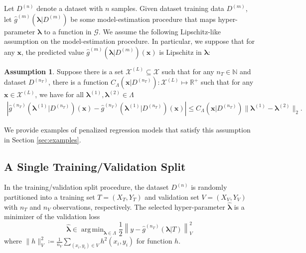 \documentclass[12pt]{article} %
\theoremstyle{definition}
\newtheorem{assump}{Assumption}
\DeclareMathOperator*{\argmin}{arg\,min}
\begin{document}
Let $D^{(n)}$ denote a dataset with $n$ samples.
Given dataset training data $D^{(m)}$, let $\hat{g}^{(m)}(\boldsymbol{\lambda} | D^{(m)})$ be some model-estimation procedure that maps hyper-parameter $\boldsymbol{\lambda}$ to a function in $\mathcal{G}$.
We assume the following Lipschitz-like assumption on the model-estimation procedure.
In particular, we suppose that for any $\boldsymbol{x}$, the predicted value $\hat{g}^{(m)}(\boldsymbol{\lambda} | D^{(m)})(\boldsymbol{x})$ is Lipschitz in $\boldsymbol{\lambda}$:
\begin{assump}
	\label{assump:lipschitz}
	Suppose there is a set $\mathcal{X}^{(L)} \subseteq \mathcal{X}$ such that for any $n_T \in \mathbb{N}$ and dataset $D^{(n_T)}$, there is a function $C_\Lambda(\boldsymbol{x} | D^{(n_T)}) : \mathcal{X}^{(L)} \mapsto \mathbb{R}^+$ such that for any $\boldsymbol{x} \in \mathcal{X}^{(L)}$, we have for all $\boldsymbol{\lambda}^{(1)}, \boldsymbol{\lambda}^{(2)} \in \Lambda$
	\begin{align}
	\left |
	\hat{g}^{(n_T)}(\boldsymbol{\lambda}^{(1)}|D^{(n_T)})(\boldsymbol{x}) - \hat{g}^{(n_T)}(\boldsymbol{\lambda}^{(1)}|D^{(n_T)})(\boldsymbol{x}) \right |
	\le C_\Lambda(\boldsymbol{x}|D^{(n_T)}) \|\boldsymbol{\lambda}^{(1)} - \boldsymbol{\lambda}^{(2)}\|_2.
	\end{align}
\end{assump}
\noindent We provide examples of penalized regression models that satisfy this assumption in Section \ref{sec:examples}.

\subsection{A Single Training/Validation Split}\label{sec:single}

In the training/validation split procedure, the dataset $D^{(n)}$ is randomly partitioned into a training set $T = (X_T, Y_T)$ and validation set $V = (X_V, Y_V)$ with $n_T$ and $n_V$ observations, respectively.
The selected hyper-parameter $\hat{\boldsymbol{\lambda}}$ is a minimizer of the validation loss
\begin{equation}
\label{eq:train_val_lambda}
\hat{\boldsymbol \lambda} \in \argmin_{\boldsymbol{\lambda} \in\Lambda} \frac{1}{2} \left \| y-\hat{g}^{(n_T)}( \boldsymbol \lambda | T) \right \|_{V}^{2}
\end{equation}
where $\| h \|^2_{V} \coloneqq \frac{1}{n_V}\sum_{(x_i, y_i)\in V} h^2(x_i, y_i)$ for function $h$.
\end{document}
